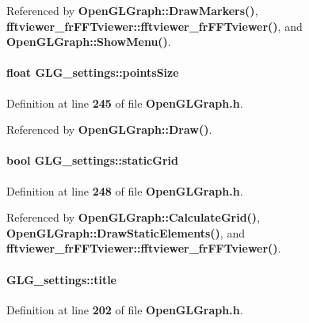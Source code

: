 Referenced by {\bf Open\+G\+L\+Graph\+::\+Draw\+Markers()}, {\bf fftviewer\+\_\+fr\+F\+F\+Tviewer\+::fftviewer\+\_\+fr\+F\+F\+Tviewer()}, and {\bf Open\+G\+L\+Graph\+::\+Show\+Menu()}.

\paragraph[{points\+Size}]{\setlength{\rightskip}{0pt plus 5cm}float G\+L\+G\+\_\+settings\+::points\+Size}\label{structGLG__settings_a4a99ad9851048d2b3e68df54bf9b3664}


Definition at line {\bf 245} of file {\bf Open\+G\+L\+Graph.\+h}.



Referenced by {\bf Open\+G\+L\+Graph\+::\+Draw()}.

\paragraph[{static\+Grid}]{\setlength{\rightskip}{0pt plus 5cm}bool G\+L\+G\+\_\+settings\+::static\+Grid}\label{structGLG__settings_aeb07273d59a53c41ff9de7f464dc4fc4}


Definition at line {\bf 248} of file {\bf Open\+G\+L\+Graph.\+h}.



Referenced by {\bf Open\+G\+L\+Graph\+::\+Calculate\+Grid()}, {\bf Open\+G\+L\+Graph\+::\+Draw\+Static\+Elements()}, and {\bf fftviewer\+\_\+fr\+F\+F\+Tviewer\+::fftviewer\+\_\+fr\+F\+F\+Tviewer()}.

\paragraph[{title}]{ G\+L\+G\+\_\+settings\+::title}\label{structGLG__settings_a721667a8fd26ecdc5529cf67ca4772e7}


Definition at line {\bf 202} of file {\bf Open\+G\+L\+Graph.\+h}.



